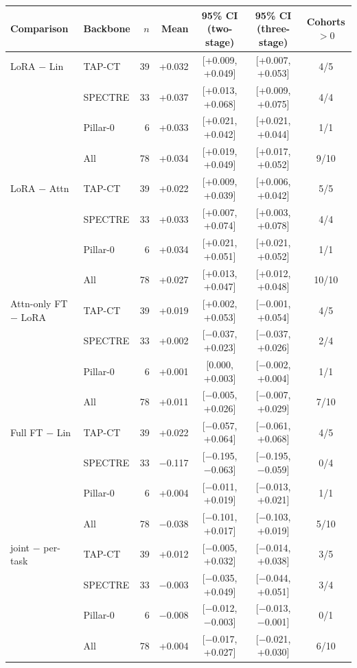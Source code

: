 \begin{tabular}{@{}llrrccc@{}}
\toprule
Comparison & Backbone & $n$ & Mean & 95\% CI (two-stage) & 95\% CI (three-stage) & Cohorts $>0$ \\
\midrule
LoRA $-$ Lin & TAP-CT & 39 & +0.032 & [+0.009, +0.049] & [+0.007, +0.053] & 4/5 \\
 & SPECTRE & 33 & +0.037 & [+0.013, +0.068] & [+0.009, +0.075] & 4/4 \\
 & Pillar-0 & 6 & +0.033 & [+0.021, +0.042] & [+0.021, +0.044] & 1/1 \\
 & All & 78 & +0.034 & [+0.019, +0.049] & [+0.017, +0.052] & 9/10 \\
\addlinespace[2pt]
LoRA $-$ Attn & TAP-CT & 39 & +0.022 & [+0.009, +0.039] & [+0.006, +0.042] & 5/5 \\
 & SPECTRE & 33 & +0.033 & [+0.007, +0.074] & [+0.003, +0.078] & 4/4 \\
 & Pillar-0 & 6 & +0.034 & [+0.021, +0.051] & [+0.021, +0.052] & 1/1 \\
 & All & 78 & +0.027 & [+0.013, +0.047] & [+0.012, +0.048] & 10/10 \\
\addlinespace[2pt]
Attn-only FT $-$ LoRA & TAP-CT & 39 & +0.019 & [+0.002, +0.053] & [$-$0.001, +0.054] & 4/5 \\
 & SPECTRE & 33 & +0.002 & [$-$0.037, +0.023] & [$-$0.037, +0.026] & 2/4 \\
 & Pillar-0 & 6 & +0.001 & [0.000, +0.003] & [$-$0.002, +0.004] & 1/1 \\
 & All & 78 & +0.011 & [$-$0.005, +0.026] & [$-$0.007, +0.029] & 7/10 \\
\addlinespace[2pt]
Full FT $-$ Lin & TAP-CT & 39 & +0.022 & [$-$0.057, +0.064] & [$-$0.061, +0.068] & 4/5 \\
 & SPECTRE & 33 & $-$0.117 & [$-$0.195, $-$0.063] & [$-$0.195, $-$0.059] & 0/4 \\
 & Pillar-0 & 6 & +0.004 & [$-$0.011, +0.019] & [$-$0.013, +0.021] & 1/1 \\
 & All & 78 & $-$0.038 & [$-$0.101, +0.017] & [$-$0.103, +0.019] & 5/10 \\
\addlinespace[2pt]
joint $-$ per-task & TAP-CT & 39 & +0.012 & [$-$0.005, +0.032] & [$-$0.014, +0.038] & 3/5 \\
 & SPECTRE & 33 & $-$0.003 & [$-$0.035, +0.049] & [$-$0.044, +0.051] & 3/4 \\
 & Pillar-0 & 6 & $-$0.008 & [$-$0.012, $-$0.003] & [$-$0.013, $-$0.001] & 0/1 \\
 & All & 78 & +0.004 & [$-$0.017, +0.027] & [$-$0.021, +0.030] & 6/10 \\

\end{tabular}
